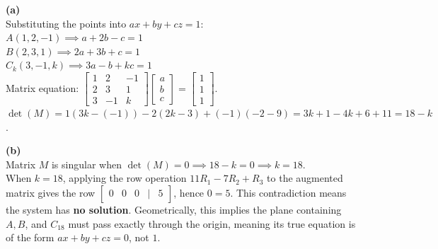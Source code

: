 \begin{solution}
\textbf{(a)} \\
Substituting the points into $ax + by + cz = 1$: \\
$A(1, 2, -1) \implies a + 2b - c = 1$ \\
$B(2, 3, 1) \implies 2a + 3b + c = 1$ \\
$C_k(3, -1, k) \implies 3a - b + kc = 1$ \\
Matrix equation: $\begin{bmatrix} 1 & 2 & -1 \\ 2 & 3 & 1 \\ 3 & -1 & k \end{bmatrix} \begin{bmatrix} a \\ b \\ c \end{bmatrix} = \begin{bmatrix} 1 \\ 1 \\ 1 \end{bmatrix}$. \\
$\det(M) = 1(3k - (-1)) - 2(2k - 3) + (-1)(-2 - 9) = 3k + 1 - 4k + 6 + 11 = 18 - k$.

\medskip
\textbf{(b)} \\
Matrix $M$ is singular when $\det(M) = 0 \implies 18 - k = 0 \implies k = 18$. \\
When $k=18$, applying the row operation $11R_1 - 7R_2 + R_3$ to the augmented matrix gives the row $\begin{bmatrix} 0 & 0 & 0 & | & 5 \end{bmatrix}$, hence $0 = 5$. This contradiction means the system has \textbf{no solution}. Geometrically, this implies the plane containing $A, B$, and $C_{18}$ must pass exactly through the origin, meaning its true equation is of the form $ax + by + cz = 0$, not $1$.


\end{solution}
